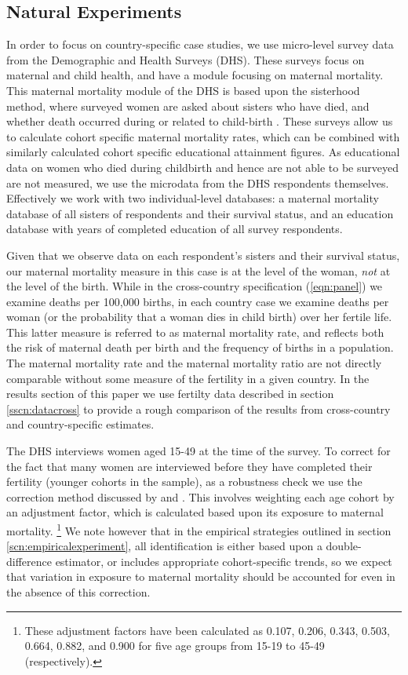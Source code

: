 \documentclass{article}[12pt,subeqn]
\begin{document}
\begin{spacing}{1.4}
\subsection{Natural Experiments}
\label{sscn:dataexp}
In order to focus on country-specific case studies, we use micro-level survey 
data from the Demographic and Health Surveys (DHS). These surveys focus on 
maternal and child health, and have a module focusing on maternal mortality. This 
maternal mortality module of the DHS is based upon the sisterhood method, where 
surveyed women are asked about sisters who have died, and whether death occurred during 
or related to child-birth \citep{RutsteinRojas2006}. These surveys allow us to 
calculate cohort specific maternal mortality rates, which can be combined with 
similarly calculated cohort specific educational attainment figures. As 
educational data on women who died during childbirth and hence are not able to be
surveyed are not measured, we use the microdata from the DHS respondents 
themselves.  Effectively we work with two individual-level databases: a maternal 
mortality database of all sisters of respondents and their survival status, and 
an education database with years of completed education of all survey respondents.

Given that we observe data on each respondent's sisters and their survival 
status, our maternal mortality measure in this case is at the level of the woman, 
\emph{not} at the level of the birth.  While in the cross-country specification 
(\ref{eqn:panel}) we examine deaths per 100,000 births, in each country case we 
examine deaths per woman (or the probability that a woman dies in child birth) 
over her fertile life. This latter measure is referred to as maternal mortality 
rate, and reflects both the risk of maternal death per birth and the frequency of 
births in a population.  The maternal mortality rate and the maternal mortality 
ratio are not directly comparable without some measure of the fertility in a given 
country. In the results section of this paper we use fertilty data described in 
section \ref{sscn:datacross} to provide a rough comparison of the results from 
cross-country and country-specific estimates.

The DHS interviews women aged 15-49 at the time of the survey. To correct 
for the fact that many women are interviewed before they have completed their 
fertility (younger cohorts in the sample), as a robustness check we use the 
correction method discussed by \citet{RutsteinRojas2006} and 
\citet{Stantonetal1997}. This involves weighting each age cohort by an adjustment 
factor, which is calculated based upon its exposure to maternal mortality.%
\footnote{These adjustment factors have been calculated as 0.107, 0.206, 0.343, 
0.503, 0.664, 0.882, and 0.900 for five age groups from 15-19 to 45-49 
(respectively).}  We note however that in the empirical strategies outlined in 
section \ref{scn:empiricalexperiment}, all identification is either based upon a 
double-difference estimator, or includes appropriate cohort-specific trends, so 
we expect that variation in exposure to maternal mortality should be accounted for 
even in the absence of this correction.


\end{spacing}
\end{document}
